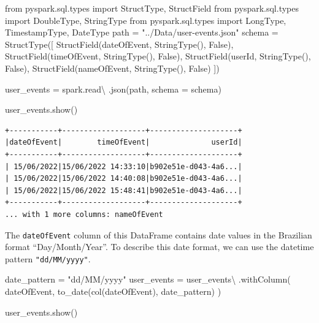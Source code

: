 \documentclass[
  11pt,
  letterpaper,
  DIV=11,
  numbers=noendperiod]{scrreprt}
\newenvironment{Shaded}{\begin{snugshade}}{\end{snugshade}}
\newcommand{\ImportTok}[1]{\textcolor[rgb]{0.00,0.46,0.62}{#1}}
\newcommand{\NormalTok}[1]{\textcolor[rgb]{0.00,0.23,0.31}{#1}}
\newcommand{\OperatorTok}[1]{\textcolor[rgb]{0.37,0.37,0.37}{#1}}
\newcommand{\StringTok}[1]{\textcolor[rgb]{0.13,0.47,0.30}{#1}}
\newcommand{\VariableTok}[1]{\textcolor[rgb]{0.07,0.07,0.07}{#1}}
\begin{document}
\begin{Shaded}
\begin{Highlighting}[]
\ImportTok{from}\NormalTok{ pyspark.sql.types }\ImportTok{import}\NormalTok{ StructType, StructField}
\ImportTok{from}\NormalTok{ pyspark.sql.types }\ImportTok{import}\NormalTok{ DoubleType, StringType}
\ImportTok{from}\NormalTok{ pyspark.sql.types }\ImportTok{import}\NormalTok{ LongType, TimestampType, DateType}
\NormalTok{path }\OperatorTok{=} \StringTok{"../Data/user{-}events.json"}
\NormalTok{schema }\OperatorTok{=}\NormalTok{ StructType([}
\NormalTok{    StructField(}\StringTok{\textquotesingle{}dateOfEvent\textquotesingle{}}\NormalTok{, StringType(), }\VariableTok{False}\NormalTok{),}
\NormalTok{    StructField(}\StringTok{\textquotesingle{}timeOfEvent\textquotesingle{}}\NormalTok{, StringType(), }\VariableTok{False}\NormalTok{),}
\NormalTok{    StructField(}\StringTok{\textquotesingle{}userId\textquotesingle{}}\NormalTok{, StringType(), }\VariableTok{False}\NormalTok{),}
\NormalTok{    StructField(}\StringTok{\textquotesingle{}nameOfEvent\textquotesingle{}}\NormalTok{, StringType(), }\VariableTok{False}\NormalTok{)}
\NormalTok{])}

\NormalTok{user\_events }\OperatorTok{=}\NormalTok{ spark.read}\OperatorTok{\textbackslash{}}
\NormalTok{    .json(path, schema }\OperatorTok{=}\NormalTok{ schema)}

\NormalTok{user\_events.show()}
\end{Highlighting}
\end{Shaded}

\begin{verbatim}
+-----------+-------------------+--------------------+
|dateOfEvent|        timeOfEvent|              userId|
+-----------+-------------------+--------------------+
| 15/06/2022|15/06/2022 14:33:10|b902e51e-d043-4a6...|
| 15/06/2022|15/06/2022 14:40:08|b902e51e-d043-4a6...|
| 15/06/2022|15/06/2022 15:48:41|b902e51e-d043-4a6...|
+-----------+-------------------+--------------------+
... with 1 more columns: nameOfEvent
\end{verbatim}

The \texttt{dateOfEvent} column of this DataFrame contains date values
in the Brazilian format ``Day/Month/Year''. To describe this date
format, we can use the datetime pattern \texttt{"dd/MM/yyyy"}.

\begin{Shaded}
\begin{Highlighting}[]
\NormalTok{date\_pattern }\OperatorTok{=} \StringTok{"dd/MM/yyyy"}
\NormalTok{user\_events }\OperatorTok{=}\NormalTok{ user\_events}\OperatorTok{\textbackslash{}}
\NormalTok{    .withColumn(}
        \StringTok{\textquotesingle{}dateOfEvent\textquotesingle{}}\NormalTok{,}
\NormalTok{        to\_date(col(}\StringTok{\textquotesingle{}dateOfEvent\textquotesingle{}}\NormalTok{), date\_pattern)}
\NormalTok{    )}

\NormalTok{user\_events.show()}
\end{Highlighting}
\end{Shaded}
\end{document}
